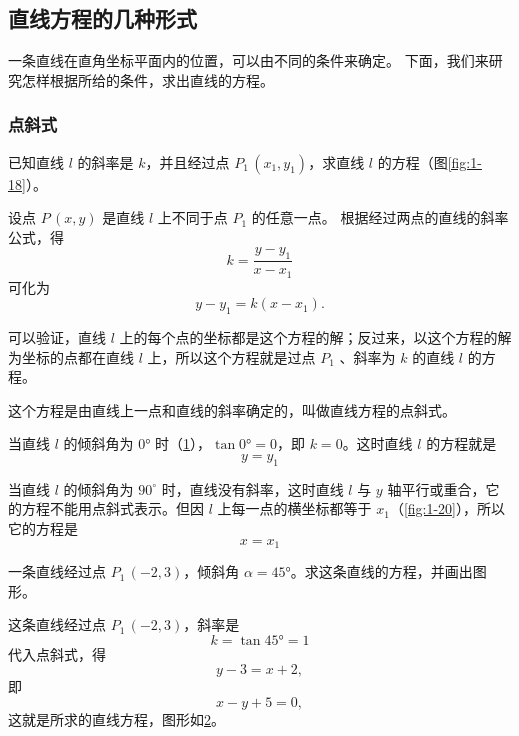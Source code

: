 \subsection{直线方程的几种形式}
一条直线在直角坐标平面内的位置，可以由不同的条件来确定。
下面，我们来研究怎样根据所给的条件，求出直线的方程。

\subsubsection{点斜式}
已知直线 $l$ 的斜率是 $k$，并且经过点 $P_1\,(x_1,y_1)$，求直线 $l$ 的方程（图\cref{fig:1-18}）。

设点 $P\,(x,y)$ 是直线 $l$ 上不同于点 $P_1$ 的任意一点。
根据经过两点的直线的斜率公式，得
\[k = \frac{y - y_1}{x - x_1} \]
可化为
\[y - y_1= k(x - x_1).\]

\begin{figure}
  \begin{minipage}[b]{0.48\linewidth}\centering
    \caption{}\label{fig:1-18}
  \end{minipage}
  \begin{minipage}[b]{0.48\linewidth}\centering
    \caption{}\label{fig:1-19}
  \end{minipage}
\end{figure}

可以验证，直线 $l$ 上的每个点的坐标都是这个方程的解；反过来，以这个方程的解为坐标的点都在直线 $l$ 上，所以这个方程就是过点 \({P}_{1}\) 、斜率为 $k$ 的直线 $l$ 的方程。

这个方程是由直线上一点和直线的斜率确定的，叫做直线方程的点斜式。

当直线 $l$ 的倾斜角为 \ang{0} 时（\cref{fig:1-19}），$\tan\ang{0}=0$，即 $k=0$。这时直线 $l$ 的方程就是
\[ y = y_1 \]

当直线 $l$ 的倾斜角为 \({90}^{ \circ }\) 时，直线没有斜率，这时直线 $l$ 与 \(y\) 轴平行或重合，它的方程不能用点斜式表示。但因 $l$ 上每一点的横坐标都等于 $x_1$（\cref{fig:1-20}），所以它的方程是
\[ x = x_1 \]

\begin{figure}
  \begin{minipage}[b]{0.48\linewidth}\centering
    \caption{}\label{fig:1-20}
  \end{minipage}
  \begin{minipage}[b]{0.48\linewidth}\centering
    \caption{}\label{fig:1-21}
  \end{minipage}
\end{figure}

\begin{example}
  一条直线经过点 $P_1\,(-2,3)$，倾斜角 $\alpha=\ang{45}$。求这条直线的方程，并画出图形。
\end{example}
\begin{solution}
  这条直线经过点 $P_1\,(-2,3)$，斜率是 
  \[k=\tan\ang{45}=1\]
  代入点斜式，得
  \[ y-3=x+2,\]
  即
  \[ x-y+5=0,\]
  这就是所求的直线方程，图形如\cref{fig:1-21}。
\end{solution}

